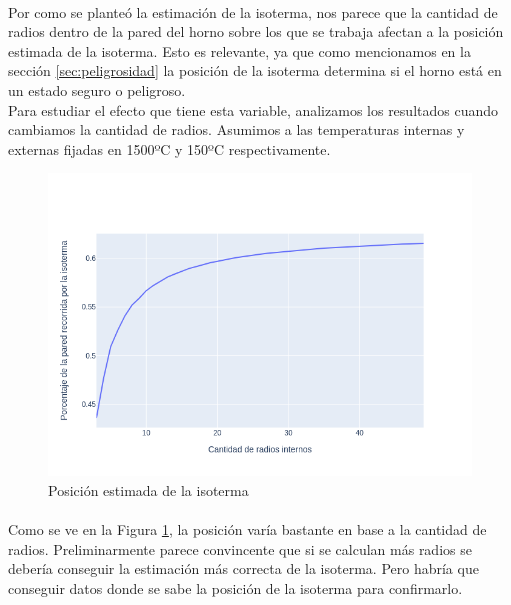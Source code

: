 \documentclass[12pt]{article}
\begin{document}
\paragraph{} Por como se planteó la estimación de la isoterma, nos parece que la cantidad de radios dentro de la pared del horno sobre los que se trabaja afectan a la posición estimada de la isoterma. Esto es relevante, ya que como mencionamos en la sección \ref{sec:peligrosidad} la posición de la isoterma determina si el horno está en un estado seguro o peligroso. \\
Para estudiar el efecto que tiene esta variable, analizamos los resultados cuando cambiamos la cantidad de radios. Asumimos a las temperaturas internas y externas fijadas en 1500ºC y 150ºC respectivamente. \\

\begin{figure}[H]
\centering
\includegraphics[scale=0.5]{isotherm_by_radii}
\caption{Posición estimada de la isoterma}
\label{fig:isotherm_by_radii}
\end{figure}

\paragraph{} Como se ve en la Figura \ref{fig:isotherm_by_radii}, la posición varía bastante en base a la cantidad de radios. Preliminarmente parece convincente que si se calculan más radios se debería conseguir la estimación más correcta de la isoterma. Pero habría que conseguir datos donde se sabe la posición de la isoterma para confirmarlo.

\end{document}
